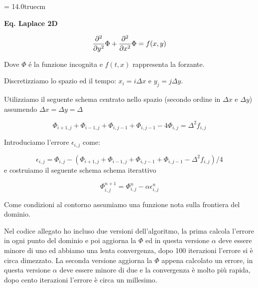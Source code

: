 \documentclass[11pt]{report}
\begin{document}
\pagestyle{empty}
\parindent 0pt
\hsize = 14.0truecm

\newcommand{\dx}{{\partial \over \partial x}}
\newcommand{\dxx}{{\partial^2 \over \partial x^2}}
\newcommand{\dyy}{{\partial^2 \over \partial y^2}}
\newcommand{\dt}{{\partial \over \partial t}}


{\bf  \begin{center} {\large \bf Eq. Laplace 2D }  \end{center} }

$$
   \dyy\Phi  + \dxx\Phi  = f(x,y) \label{1} 
$$


Dove $\Phi$ \'e la funzione incognita e $f(t,x)$ rappresenta la forzante.

Discretizziamo lo spazio ed il tempo: $x_i= i\Delta x$ e $ y_j=j \Delta y$.

Utilizziamo il seguente schema centrato nello spazio (secondo ordine in $\Delta x$ e $\Delta y$) assumendo 
$\Delta x = \Delta y = \Delta$ 

$$ 
\Phi_{i+1,j}+\Phi_{i-1,j}+\Phi_{i,j-1}+\Phi_{i,j-1}-4\Phi_{i,j} = \Delta^2 f_{i,j}    \label{2} 
$$

Introduciamo l'errore $\epsilon_{i,j}$ come:

$$ 
 \epsilon_{i,j}   = \Phi_{i,j} - (\Phi_{i+1,j}+\Phi_{i-1,j}+\Phi_{i,j-1}+\Phi_{i,j-1} - \Delta^2 f_{i,j})/4    \label{3} 
$$
e costruiamo il seguente schema schema iterattivo

$$ 
 \Phi^{n+1}_{i,j}=  \Phi^{n}_{i,j} -\alpha \epsilon^{n}_{i,j}    \label{4} 
$$

Come condizioni al contorno assumiamo una funzione nota sulla frontiera del dominio.

Nel codice allegato ho incluso due versioni dell'algoritmo, la prima calcola l'errore in ogni punto del dominio e poi aggiorna la $\Phi$ ed in questa versione $\alpha$ deve essere minore di uno ed abbiamo una lenta convergenza, dopo 100 iterazioni l'errore si è circa dimezzato. La seconda versione aggiorna la $\Phi$ appena calcolato un errore, in questa versione $\alpha$ deve essere minore di due e la convergenza è molto più rapida, dopo cento iterazioni l'errore è circa un millesimo.
\end{document}
